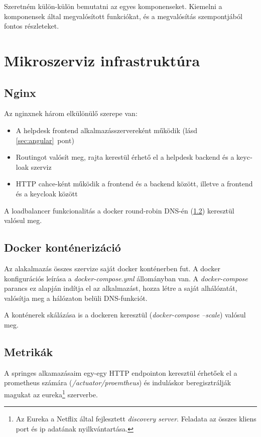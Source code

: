 Szeretném külön-külön bemutatni az egyes komponenseket. Kiemelni a komponensek által megvalósított funkciókat, és a megvalósítás szempontjából fontos részleteket. 

\section{Mikroszerviz infrastruktúra}
\subsection{Nginx}\label{sec:nginx}
Az nginxnek három elkülönülő szerepe van:

\begin{itemize}
	\item{A \foreignlanguage{british}{helpdesk frontend} alkalmazásszervereként működik (lásd \ref{sec:angular}~pont)}
	
	\item{\foreignlanguage{british}{Routing}ot valósít meg, rajta kerestül érhető el a \foreignlanguage{british}{helpdesk backend} és a \foreignlanguage{british}{keycloak} szerviz}
	
	\item{\foreignlanguage{british}{HTTP cahce}-ként működik a frontend és a backend között, illetve a frontend és a keycloak között}
\end{itemize}

A loadbalancer funkcionalitás a \foreignlanguage{british}{docker round-robin DNS}-én (\ref{sec:docker}) keresztül valósul meg.


\subsection{Docker konténerizáció}\label{sec:docker}
Az alakalmazás összes szervize saját docker konténerben fut. A docker konfigurációs leírása a \textit{docker-compose.yml} állományban van. A \textit{docker-compose} parancs ez alapján indítja el az alkalmazást, hozza létre a saját alhálózatát, valósítja meg a hálózaton belüli DNS-funkciót.

A konténerek skálázása  is a dockeren keresztül (\textit{docker-compose --scale}) valósul meg.



\subsection{Metrikák}\label{sec:metrikak}
A springes alkamazásaim egy-egy HTTP endpointon keresztül érhetőek el a prometheus számára (\textit{\mbox{/actuator/proemtheus}}) és induláskor beregisztrálják magukat az eureka\footnote{Az Eureka a Netflix által fejlesztett \textit{discovery server}. Feladata az összes kliens port és ip adatának nyilkvántartása.} szerverbe.

